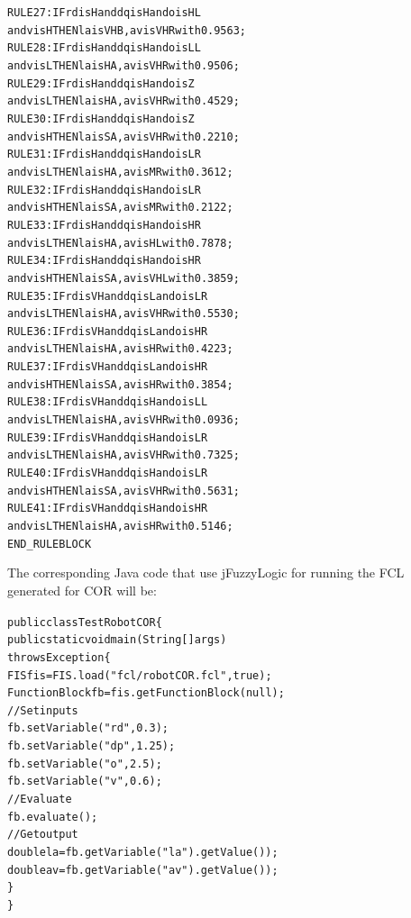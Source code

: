 \documentclass[11pt,twoside]{article}
\begin{document}
\begin{multicols}{2}
\begin{scriptsize}
\begin{alltt}
RULE 27: IF rd is  H and dq is H and o is HL 
    and v is H THEN la is VHB , av is VHR with 0.9563;
RULE 28: IF rd is  H and dq is H and o is LL 
    and v is L THEN la is  HA , av is VHR with 0.9506;
RULE 29: IF rd is  H and dq is H and o is  Z 
    and v is L THEN la is  HA , av is VHR with 0.4529;
RULE 30: IF rd is  H and dq is H and o is  Z 
    and v is H THEN la is  SA , av is VHR with 0.2210;
RULE 31: IF rd is  H and dq is H and o is LR 
    and v is L THEN la is  HA , av is  MR with 0.3612;
RULE 32: IF rd is  H and dq is H and o is LR 
    and v is H THEN la is  SA , av is  MR with 0.2122;
RULE 33: IF rd is  H and dq is H and o is HR 
    and v is L THEN la is  HA , av is  HL with 0.7878;
RULE 34: IF rd is  H and dq is H and o is HR 
    and v is H THEN la is  SA , av is VHL with 0.3859;
RULE 35: IF rd is VH and dq is L and o is LR 
    and v is L THEN la is  HA , av is VHR with 0.5530;
RULE 36: IF rd is VH and dq is L and o is HR 
    and v is L THEN la is  HA , av is  HR with 0.4223;
RULE 37: IF rd is VH and dq is L and o is HR 
    and v is H THEN la is  SA , av is  HR with 0.3854;
RULE 38: IF rd is VH and dq is H and o is LL 
    and v is L THEN la is  HA , av is VHR with 0.0936;
RULE 39: IF rd is VH and dq is H and o is LR 
    and v is L THEN la is  HA , av is VHR with 0.7325;
RULE 40: IF rd is VH and dq is H and o is LR 
    and v is H THEN la is  SA , av is VHR with 0.5631;
RULE 41: IF rd is VH and dq is H and o is HR 
    and v is L THEN la is  HA , av is  HR with 0.5146;
END\_RULEBLOCK
\end{alltt}
\end{scriptsize}
\vspace*{10pt}

\vspace*{10pt}
The corresponding Java code that use jFuzzyLogic for running the FCL generated for COR will be:
\\
\begin{scriptsize}
\begin{alltt}
public class TestRobotCOR \{
  public static void main(String[] args) 
  throws Exception \{
    FIS fis = FIS.load("fcl/robotCOR.fcl", true);
    FunctionBlock fb = fis.getFunctionBlock(null);
    // Set inputs
    fb.setVariable("rd", 0.3); 
    fb.setVariable("dp", 1.25);
    fb.setVariable("o", 2.5); 
    fb.setVariable("v", 0.6);
    // Evaluate
    fb.evaluate(); 
    // Get output
    double la = fb.getVariable("la").getValue());
    double av = fb.getVariable("av").getValue());
  \}
\}
\end{alltt}
\end{scriptsize}


\end{multicols}
\end{document}
